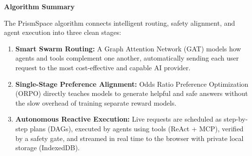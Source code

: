 \documentclass[11pt,a4paper]{article}
\begin{document}
\vspace{0.7em}
\textbf{Algorithm Summary}

The PrismSpace algorithm connects intelligent routing, safety alignment, and agent execution into three clean stages:

\begin{enumerate}[leftmargin=1.5em, itemsep=0.20em, topsep=0.06em]
    \item \textbf{Smart Swarm Routing:} A Graph Attention Network (GAT) models how agents and tools complement one another, automatically sending each user request to the most cost-effective and capable AI provider.
    \item \textbf{Single-Stage Preference Alignment:} Odds Ratio Preference Optimization (ORPO) directly teaches models to generate helpful and safe answers without the slow overhead of training separate reward models.
    \item \textbf{Autonomous Reactive Execution:} Live requests are scheduled as step-by-step plans (DAGs), executed by agents using tools (ReAct + MCP), verified by a safety gate, and streamed in real time to the browser with private local storage (IndexedDB).
\end{enumerate}
\end{document}
